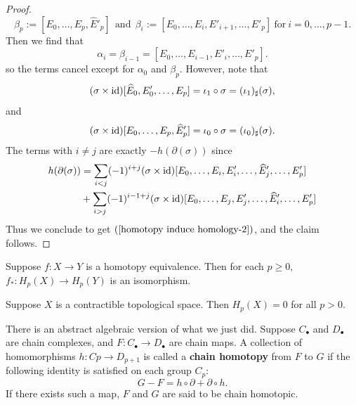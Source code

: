 \begin{proof}
\[\beta_p:=[E_0,\dots,E_p,\widehat{E}'_p]\ \ \text{and}\ \ \beta_i:=[E_0,\dots,E_{i},E'_{i+1},\dots,E'_p]\ \text{for}\ i=0,\dots,p-1.\]
Then we find that 
\[\alpha_i=\beta_{i-1}=[E_0,\dots,E_{i-1},E'_{i},\dots,E'_p].\]
so the terms cancel except for $\alpha_0$ and $\beta_p$. However, note that 
\[(\sigma\times\mathrm{id})[\widehat{E}_0,E'_0,\dots,E_p]=\iota_1\circ\sigma=(\iota_1)_\sharp(\sigma),\]
and 
\[(\sigma\times\mathrm{id})[E_0,\dots,E_p,\widehat{E}'_p]=\iota_0\circ\sigma=(\iota_0)_\sharp(\sigma).\]
The terms with $i\neq j$ are exactly $-h(\partial(\sigma))$ since
\begin{align*}
h(\partial(\sigma))&=\sum_{i<j}(-1)^{i+j}(\sigma\times\mathrm{id})[E_0,\dots,E_i,E'_i,\dots,\widehat{E}'_j,\dots,E'_p]\\
&+\sum_{i>j}(-1)^{i-1+j}(\sigma\times\mathrm{id})[E_0,\dots,E_j,E'_j,\dots,\widehat{E}'_i,\dots,E'_p]
\end{align*}
Thus we conclude to get $(\ref{homotopy induce homology-2})$, and the claim follows.
\end{proof}
\begin{corollary}
Suppose $f:X\to Y$ is a homotopy equivalence. Then for each $p\geq0$, $f_*:H_p(X)\to H_p(Y)$ is an isomorphism.
\end{corollary}
\begin{corollary}\label{homology comtractible}
Suppose $X$ is a contractible topological space. Then $H_p(X)=0$ for all $p>0$.
\end{corollary}
There is an abstract algebraic version of what we just did. Suppose $C_\bullet$ and $D_\bullet$ are chain complexes, and $F:C_\bullet\to D_\bullet$ are chain maps. A collection of homomorphisms $h:Cp\to D_{p+1}$ is called a \textbf{chain homotopy} from $F$ to $G$ if the following identity is satisfied on each group $C_p$:
\[G-F=h\circ\partial+\partial\circ h.\]
If there exists such a map, $F$ and $G$ are said to be chain homotopic.
